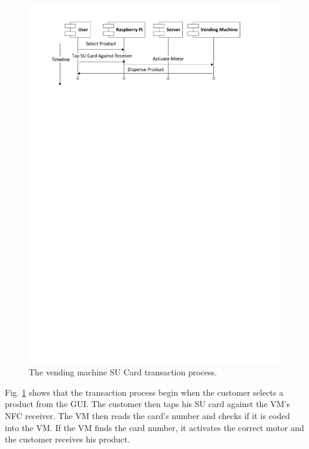 \begin{figure}
 \centering 
 \includegraphics[clip=true, trim = 0 650 0 40,
 scale=0.7]{su_card_transaction_processflow}
 \caption{The vending machine SU Card transaction process.}
 \label{fig:vm_su_interaction}
\end{figure}

Fig. \ref{fig:vm_su_interaction} shows that the transaction process begin when the
customer selects a product from the GUI. The customer then taps his SU card against the
VM's NFC receiver. The VM then reads the card's number
and checks if it is coded into the VM. If the VM finds the card number, it activates the correct motor and
the customer receives his product.